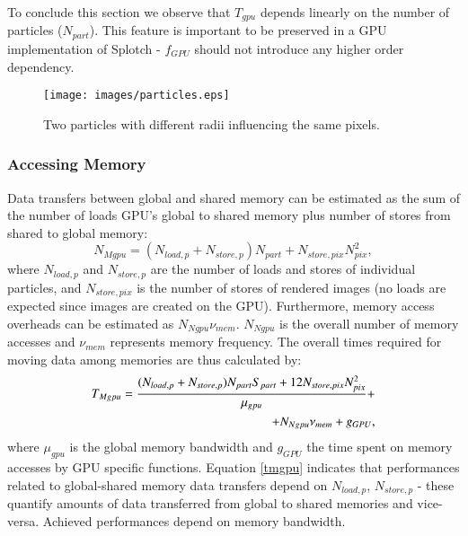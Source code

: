 \documentclass[1p]{elsarticle}
\begin{document}
To conclude this section we observe that $T_{gpu}$ depends linearly on the number of particles ($N_{part}$). This feature is important to be preserved in a GPU implementation of Splotch - $f_{GPU}$ should not introduce any higher order dependency. 

\begin{figure}
\centering
\texttt{[image: images/particles.eps]}
\caption{Two particles with different radii influencing the same pixels.}
\label{fig:particles}
\end{figure}


\subsubsection{Accessing Memory}
Data transfers between global and shared memory can be estimated 
as the sum of the number of loads 
GPU's global to shared memory plus number of stores from shared to global memory:
\begin{equation}
N_{Mgpu} = (N_{load,p} + N_{store,p}) N_{part} + N_{store,pix} N_{pix}^2,
\end{equation}
where $N_{load,p}$ and $N_{store,p}$ are the number of loads and stores of individual 
particles, and $N_{store,pix}$ is the number of stores of rendered images (no loads 
are expected since images are created on the GPU). 
Furthermore, memory access overheads can be estimated as $N_{Ngpu} \nu_{mem}$. $N_{Ngpu}$ is the overall number of memory accesses and $\nu_{mem}$ represents memory frequency. The overall times required for moving data among memories are thus calculated by:
\begin{equation}\label{tmgpu}
\begin{split}
T_{Mgpu} = {(N_{load,p} + N_{store,p}) N_{part} S_{part}
+ 12 N_{store,pix} N_{pix}^2\over \mu_{gpu}} + \\
+ N_{Ngpu} \nu_{mem} + g_{GPU},
\end{split}
\end{equation}
where $\mu_{gpu}$ is the global memory bandwidth
and $g_{GPU}$ the time 
spent on memory accesses by GPU specific functions. Equation \eqref{tmgpu} indicates that performances related to global-shared memory data transfers depend on $N_{load,p}$, $N_{store,p}$ - these quantify amounts of data transferred from global to shared memories and vice-versa. Achieved performances depend on memory bandwidth.
\end{document}
